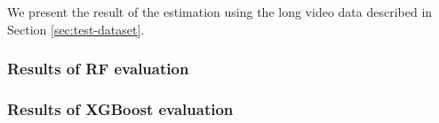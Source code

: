 

%
We present the result of the estimation using the long video data described in Section \ref{sec:test-dataset}.

\subsubsection{Results of RF evaluation}


\subsubsection{Results of XGBoost evaluation}

